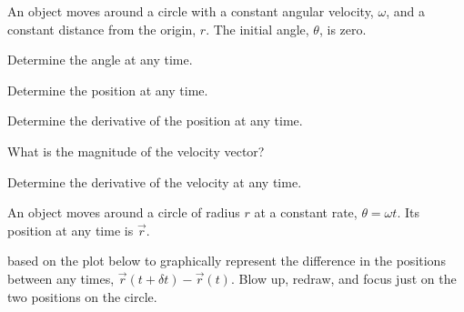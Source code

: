 
\begin{problem}
\item An object moves around a circle with a constant angular
  velocity, $\omega$, and a constant distance from the origin,
  $r$. The initial angle, $\theta$, is zero.
  \begin{subproblem}
  \item Determine the angle at any time.
    \vfill
  \item Determine the position at any time.
    \vfill
  \item Determine the derivative of the position at any time.
    \vfill
  \item What is the magnitude of the velocity vector?
    \vfill
  \item Determine the derivative of the velocity at any time.
    \vfill
  \end{subproblem}

  \clearpage

\item An object moves around a circle of radius $r$  at a constant
  rate, $\theta=\omega t$. Its position at any time is $\vec{r}$.

  \begin{subproblem}
  \item based on the plot below to graphically represent the
    difference in the positions between any times, $\vec{r}(t+\delta
    t)-\vec{r}(t)$. Blow up, redraw, and focus just on the two
    positions on the circle.

    \vfill


\end{subproblem}
\end{problem}
